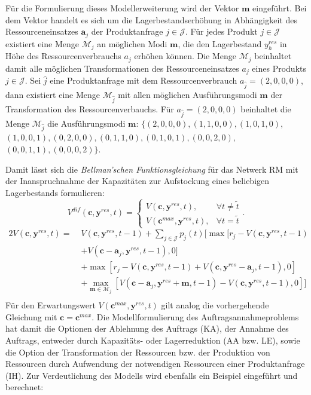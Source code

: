Für die Formulierung dieses Modellerweiterung wird der Vektor $\textbf{m}$ eingeführt. Bei dem Vektor handelt es sich um die Lagerbestandserhöhung in Abhängigkeit des Ressourceneinsatzes $\textbf{a}_{j}$ der Produktanfrage $j\in\mathcal{J}$. Für jedes Produkt $j\in\mathcal{J}$ existiert eine Menge $\mathcal{M}_j$ an möglichen Modi $\textbf{m}$, die den Lagerbestand $y^{res}_h$ in Höhe des Ressourcenverbrauchs $a_{j}$ erhöhen können. Die Menge $\mathcal{M}_j$ beinhaltet damit alle möglichen Transformationen des Ressourceneinsatzes $a_{j}$ eines Produkts $j\in\mathcal{J}$. Sei $\hat{j}$ eine Produktanfrage mit dem Ressourcenverbrauch $a_{\hat{j}}=(2,0,0,0)$, dann existiert eine Menge $\mathcal{M}_{\hat{j}}$ mit allen möglichen Ausführungsmodi $\textbf{m}$ der Transformation des Ressourcenverbauchs. Für $a_{\hat{j}}=(2,0,0,0)$ beinhaltet die Menge $\mathcal{M}_{\hat{j}}$ die Ausführungsmodi $\textbf{m}$: $\{ (2, 0, 0, 0), (1, 1, 0, 0), (1, 0, 1, 0),$ $(1, 0, 0, 1), (0 ,2, 0, 0), (0, 1, 1, 0), (0, 1, 0, 1), (0, 0, 2, 0),$ $(0, 0, 1, 1), (0, 0, 0, 2)\}$.

Damit lässt sich die \textit{Bellman'schen Funktionsgleichung} für das Netwerk RM mit der Inanspruchnahme der Kapazitäten zur Aufstockung eines beliebigen Lagerbestands formulieren:
\begin{equation}\label{dif}
     V^{dif}(\textbf{c}, \textbf{y}^{res}, t)=\left\{\begin{array}{ll} V(\textbf{c}, \textbf{y}^{res}, t), & \forall t\neq\tilde{t}\\
         V(\textbf{c}^{max}, \textbf{y}^{res}, t), &\forall t=\tilde{t}\end{array}\right. .
\end{equation}
\begin{alignat*}{2}
 V(\textbf{c}, \textbf{y}^{res}, t) = \;& V(\textbf{c}, \textbf{y}^{res}, t-1)+ \sum_{j \in \mathcal{J}}p_{j}(t)[\max[r_{j} - V(\textbf{c}, \textbf{y}^{res}, t-1)\\
&+ V(\textbf{c}-\textbf{a}_j, \textbf{y}^{res}, t-1),0] \\
&+ \max[r_{j} - V(\textbf{c}, \textbf{y}^{res}, t-1) + V(\textbf{c}, \textbf{y}^{res}-\textbf{a}_j, t-1),0]\\
&+ \max_{\textbf{m}\in\mathcal{M}_{j}}[V(\textbf{c}-\textbf{a}_j, \textbf{y}^{res}+\textbf{m}, t-1) - V(\textbf{c}, \textbf{y}^{res}, t-1) ,0]]\\
\end{alignat*}
Für den Erwartungswert $V(\textbf{c}^{max}, \textbf{y}^{res}, t)$ gilt analog die vorhergehende Gleichung mit $\textbf{c}=\textbf{c}^{max}$. Die Modellformulierung des Auftragsannahmeproblems hat damit die Optionen der Ablehnung des Auftrags (KA), der Annahme des Auftrags, entweder durch Kapazitäts- oder Lagerreduktion (AA bzw. LE), sowie die Option der Transformation der Ressourcen bzw. der Produktion von Ressourcen durch Aufwendung der notwendigen Ressourcen einer Produktanfrage (IH). Zur Verdeutlichung des Modells wird ebenfalls ein Beispiel eingeführt und berechnet:

